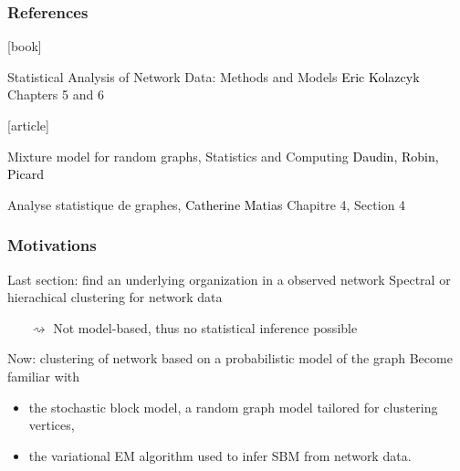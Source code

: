 \documentclass{beamer}\usepackage[]{graphicx}\usepackage[]{color}
\begin{document}
\begin{frame}
  \frametitle{References}

    \begin{thebibliography}{99}
      [book]

     Statistical Analysis of Network Data: Methods and Models
    \newblock \textcolor{black}{Eric Kolazcyk}
    \newblock \alert{Chapters 5 and 6}

      [article]

     Mixture model for random graphs, Statistics and Computing
    \newblock \textcolor{black}{Daudin, Robin, Picard}

     Analyse statistique de graphes,
    \newblock \textcolor{black}{Catherine Matias}
    \newblock \alert{Chapitre 4, Section 4}

    \end{thebibliography}

\end{frame}

\begin{frame}
  \frametitle{Motivations}

  \begin{block}{Last section: \alert{find an underlying organization in a observed network}}
    Spectral or hierachical clustering for network data \\
    \begin{itemize}
      \item[$\rightsquigarrow$] \alert{Not model-based}, thus no statistical inference possible
    \end{itemize}
  \end{block}

  \begin{block}{Now: \alert{clustering of network based on a probabilistic model of the graph}}
    Become familiar with
    \begin{itemize}
      \item the stochastic block model, a random graph model tailored for clustering vertices,
      \item the variational EM algorithm used to infer SBM from network data.
    \end{itemize}
  \end{block}


\end{frame}
\end{document}

